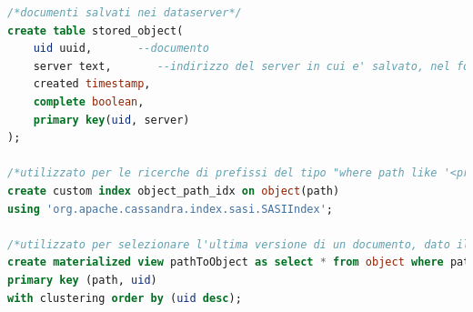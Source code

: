 \documentclass[11pt,a4paper,english]{article}
\begin{document}
\begin{lstlisting}[language=SQL, title=Struttura]
/*documenti salvati nei dataserver*/
create table stored_object(
    uid uuid,       --documento
    server text,       --indirizzo del server in cui e' salvato, nel formato host:port
    created timestamp,
    complete boolean,
    primary key(uid, server)
);

/*utilizzato per le ricerche di prefissi del tipo "where path like '<prefix>%'"*/
create custom index object_path_idx on object(path)
using 'org.apache.cassandra.index.sasi.SASIIndex';

/*utilizzato per selezionare l'ultima versione di un documento, dato il path (con cql non e' possibile ordinare nella query) */
create materialized view pathToObject as select * from object where path is not null
primary key (path, uid)
with clustering order by (uid desc);


\end{lstlisting}
\end{document}
